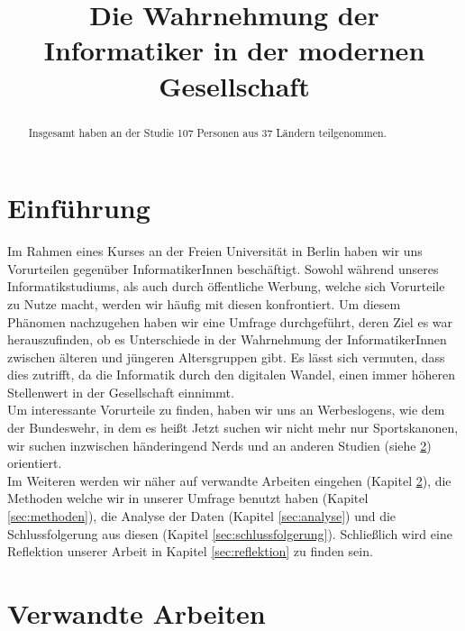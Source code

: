 \documentclass[de]{agse-empir-report}\usepackage[]{graphicx}\usepackage[]{color}
\begin{document}
\title{Die Wahrnehmung der Informatiker in der modernen Gesellschaft}
\author{
    \and
    \and
}

\maketitle



\begin{abstract}
    \lipsum[1]
    Insgesamt haben an der Studie 107 Personen
    aus 37 Ländern teilgenommen.
\end{abstract}


\section[jk]{Einführung}

Im Rahmen eines Kurses an der Freien Universität in Berlin haben wir uns Vorurteilen gegenüber InformatikerInnen beschäftigt. Sowohl während unseres Informatikstudiums, als auch durch öffentliche Werbung, welche sich Vorurteile zu Nutze macht, werden wir häufig mit diesen konfrontiert.
Um diesem Phänomen nachzugehen haben wir eine Umfrage durchgeführt, deren Ziel es war herauszufinden, ob es Unterschiede in der Wahrnehmung der InformatikerInnen zwischen älteren und jüngeren Altersgruppen gibt. Es lässt sich vermuten, dass dies zutrifft, da die Informatik durch den digitalen Wandel, einen immer höheren Stellenwert in der Gesellschaft einnimmt.\\
Um interessante Vorurteile zu finden, haben wir uns an Werbeslogens, wie dem der Bundeswehr, in dem es heißt \glqq Jetzt suchen wir nicht mehr nur Sportskanonen, wir suchen inzwischen händeringend Nerds \grqq \cite{Bundeswehr} und an anderen Studien (siehe \ref{sec:verwandteArbeiten}) orientiert. \\
Im Weiteren werden wir näher auf verwandte Arbeiten eingehen (Kapitel \ref{sec:verwandteArbeiten}), die Methoden welche wir in unserer Umfrage benutzt haben (Kapitel \ref{sec:methoden}), die Analyse der Daten (Kapitel \ref{sec:analyse}) und die Schlussfolgerung aus diesen (Kapitel \ref{sec:schlussfolgerung}). Schließlich wird eine Reflektion unserer Arbeit in Kapitel \ref{sec:reflektion} zu finden sein.


\section[kk]{Verwandte Arbeiten} \label{sec:verwandteArbeiten}
\end{document}
